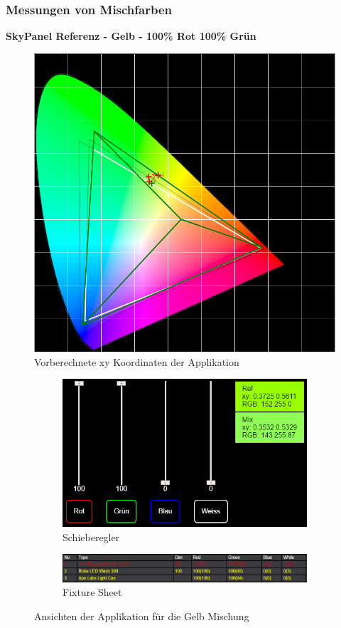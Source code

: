 \documentclass[11pt]{scrartcl}
\begin{document}
\subsubsection{Messungen von Mischfarben} \label{equalizationMeasurments}
\textbf{SkyPanel Referenz - Gelb - 100\% Rot 100\% Grün}
\begin{figure}[H]
    \begin{center}
        \includegraphics[width=.8\textwidth]{images/app_mix_yellow_cie.png}
    \end{center}
    \caption{Vorberechnete xy Koordinaten der Applikation}
\end{figure}
\noindent
\begin{figure}[H]
    \centering
    \begin{subfigure}[b]{.39\textwidth}
        \includegraphics[width=\textwidth]{images/app_mix_yellow_faders.png}
        \caption{Schieberegler}
    \end{subfigure}
    \hfill 
    \begin{subfigure}[b]{.59\textwidth}
        \includegraphics[width=\textwidth]{images/app_mix_yellow_fixtureSheet.png}
        \caption{Fixture Sheet}
    \end{subfigure}
    \caption{Ansichten der Applikation für die Gelb Mischung}
\end{figure}
\end{document}

